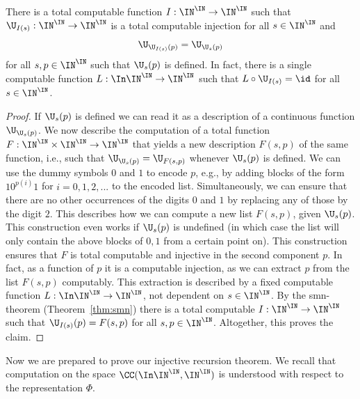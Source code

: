 \begin{lem}[Injection]
\label{lem:injection}
There is a total computable function $I:\IN^\IN\to\IN^\IN$ such that
$\U_{I(s)}:\IN^\IN\to\IN^\IN$ is a total computable injection for all $s\in\IN^\IN$ and
\[\U_{\U_{I(s)}(p)}=\U_{\U_s(p)}\]
for all $s,p\in\IN^\IN$ such that $\U_s(p)$ is defined. In fact, there is a single computable
function $L:\In\IN^\IN\to\IN^\IN$ such that $L\circ\U_{I(s)}=\id$ for all $s\in\IN^\IN$.
\end{lem}
\begin{proof}
If $\U_s(p)$ is defined we can read it as a description of a continuous function $\U_{\U_s(p)}$.
We now describe the computation of a total function $F:\IN^\IN\times\IN^\IN\to\IN^\IN$ that
yields a new description $F(s,p)$ of the same function, i.e., such that $\U_{\U_s(p)}=\U_{F(s,p)}$
whenever $\U_s(p)$ is defined. 
We can use the dummy symbols
$0$ and $1$ to encode $p$, e.g., by adding blocks of the form $10^{p(i)}1$ for $i=0,1,2,...$ to the encoded list.
Simultaneously, we can ensure that there are no other occurrences of the digits $0$ and $1$ by replacing
any of those by the digit $2$.
This describes how we can compute a new list $F(s,p)$, given $\U_s(p)$. 
This construction even works if $\U_s(p)$ is undefined (in which case the list will only contain the above blocks of $0,1$ from
a certain point on). 
This construction ensures that
$F$ is total computable and injective in the second component $p$. In fact, as a function of $p$ 
it is a computable injection, as we can extract $p$ from the list $F(s,p)$ computably. 
This extraction is described by a fixed computable function $L:\In\IN^\IN\to\IN^\IN$, not dependent on $s\in\IN^\IN$.
By the smn-theorem (Theorem~\ref{thm:smn}) 
there is 
a total computable $I:\IN^\IN\to\IN^\IN$ such that $\U_{I(s)}(p)=F(s,p)$ for all $s,p\in\IN^\IN$.
Altogether, this proves the claim.
\end{proof}

\noindent
Now we are prepared to prove our injective recursion theorem. We recall that computation on the space
$\CC(\In\IN^\IN,\IN^\IN)$ is understood with respect to the representation $\Phi$.

